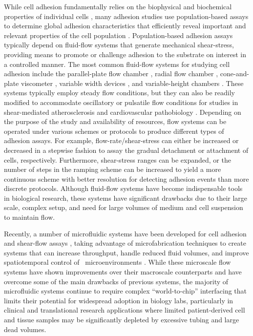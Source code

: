 While cell adhesion fundamentally relies on the biophysical and biochemical properties of individual cells \cite{Orsello:2001uq}, many adhesion studies use population-based assays to determine global adhesion characteristics that efficiently reveal important and relevant properties of the cell population \cite{Christ:2010ly}. Population-based adhesion assays typically depend on fluid-flow systems that generate mechanical shear-stress, providing means to promote or challenge adhesion to the substrate on interest in a controlled manner. The most common fluid-flow systems for studying cell adhesion include the parallel-plate flow chamber \cite{GIAVAZZI:1993ty}, radial flow chamber \cite{Goldstein:2002p106}, cone-and-plate viscometer \cite{Jadhav:2001ys}, variable width devices \cite{Heilshorn:2003ly,Usami:1993p603}, and variable-height chambers \cite{Xiao:1996p618}. These systems typically employ steady flow conditions, but they can also be readily modified to accommodate oscillatory or pulsatile flow conditions for studies in shear-mediated atherosclerosis and cardiovascular pathobiology \cite{KU:1985uq,Chappell:1998fk}. Depending on the purpose of the study and availability of resources, flow systems can be operated under various schemes or protocols to produce different types of adhesion assays. For example, flow-rate\slash shear-stress can either be increased or decreased in a stepwise fashion to assay the gradual detachment or attachment of cells, respectively. Furthermore, shear-stress ranges can be expanded, or the number of steps in the ramping scheme can be increased to yield a more continuous scheme with better resolution for detecting adhesion events than more discrete protocols. Although fluid-flow systems have become indispensable tools in biological research, these systems have significant drawbacks due to their large scale, complex setup, and need for large volumes of medium and cell suspension to maintain flow. 

Recently, a number of microfluidic systems have been developed for cell adhesion and shear-flow assays \cite{Lu:2004ys,Gutierrez:2007p290,Plouffe:2007p274,Young:2007ml}, taking advantage of microfabrication techniques to create systems that can increase throughput, handle reduced fluid volumes, and improve spatiotemporal control of \invitro\ microenvironments \cite{Young:2010p286,Young:2010uq}. While these microscale flow systems have shown improvements over their macroscale counterparts and have overcome some of the main drawbacks of previous systems, the majority of microfluidic systems continue to require complex ``world-to-chip'' interfacing \cite{Fredrickson:2004ve} that limits their potential for widespread adoption in biology labs, particularly in clinical and translational research applications where limited patient-derived cell and tissue samples may be significantly depleted by excessive tubing and large dead volumes. 

